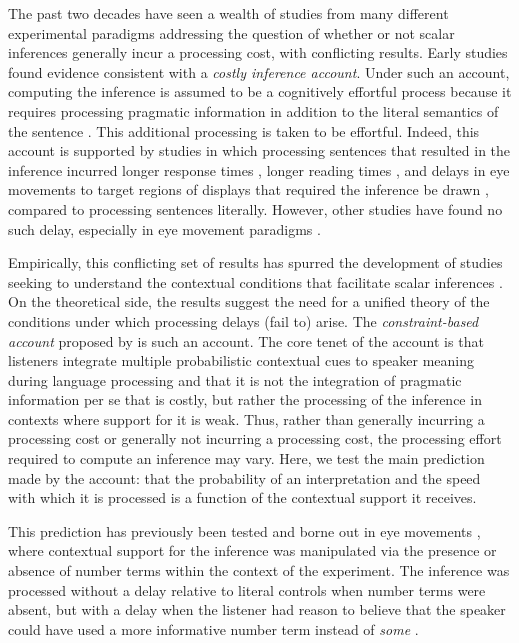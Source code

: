 \documentclass[10pt,letterpaper]{article}
\newcommand{\jd}[1]{\textcolor{Red}{[jd: #1]}}
\begin{document}
The past two decades have seen a wealth of studies from many different experimental paradigms addressing the question of whether or not scalar inferences generally incur a processing cost, with conflicting results. Early studies found evidence consistent with a \emph{costly inference account}. Under such an account, computing the inference is assumed to be a cognitively effortful process because it requires processing pragmatic information in addition to the literal semantics of the sentence  \cite{HuangSnedeker2009, TomlinsonEtAl2012}. This additional processing is taken to be effortful. Indeed, this account is supported by studies in which processing sentences that resulted in the inference incurred longer response times \cite{BottNoveck2004, TomlinsonEtAl2012,DegenTanenhaus2015}, longer reading times \cite{BrehenyEtAl2006}, and delays in eye movements to target regions of displays that required the inference be drawn \cite{HuangSnedeker2009,HuangSnedeker2011,DegenTanenhaus2016}, compared to  processing sentences literally. However, other studies have found no such delay, especially in eye movement paradigms \cite{Grodner2010,Breheny2013,DegenTanenhaus2016,SunBreheny2019}. 

Empirically, this conflicting set of results has spurred the development of studies seeking to understand the contextual conditions that facilitate scalar inferences \cite{Zondervan2010,BonnefonEtAl2009,Degen2015,Augurzky2019,MartyChemla2013,DegenGoodman2014,SunBreheny2019}. On the theoretical side, the results suggest the need for a unified theory of the conditions under which processing delays (fail to) arise. The \emph{constraint-based account} proposed by  is such an account. The core tenet of the account is that listeners integrate multiple probabilistic contextual cues to speaker meaning during language processing and that it is not the integration of pragmatic information per se that is costly, but rather the processing of the inference in contexts where support for it is weak. Thus, rather than generally incurring a processing cost or generally not incurring a processing cost, the processing effort required to compute an inference may vary. Here, we test the main prediction made by the account: that the probability of an interpretation and the speed with which it is processed is a function of the contextual support it receives. 

This prediction has previously been tested and borne out in eye movements \cite{DegenTanenhaus2016}, where contextual support for the inference was manipulated via the presence or absence of number terms within the context of the experiment. The inference was processed without a delay relative to literal controls when number terms were absent, but with a delay when the listener had reason to believe that the speaker could have used a more informative number term instead of \emph{some} \cite{DegenTanenhaus2016}.%
\end{document}
